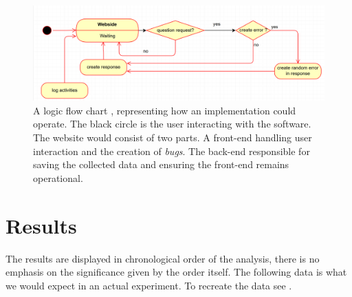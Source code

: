 \documentclass[runningheads]{llncs}
\begin{document}
\begin{figure}
    \includegraphics[width=\textwidth]{UML Prototyp.PNG}
    \caption{A logic flow chart , representing how an implementation could operate.
    The black circle is the user interacting with the software. The website would
    consist of two parts. A front-end handling user interaction and the creation of {\itshape bugs}.
    The back-end responsible for saving the collected data and ensuring the front-end
    remains operational.} \label{fig1}
\end{figure}
\newpage
\section{Results}
The results are displayed in chronological order of the analysis, there is
no emphasis on the significance given by the order itself. The following data is
what we would expect in an actual experiment. To recreate the data see \cite{ref_soft}.
\end{document}
